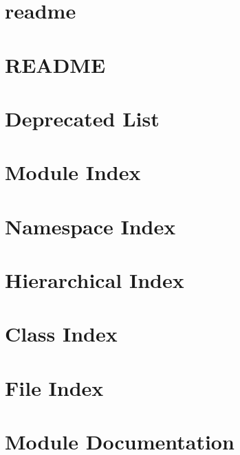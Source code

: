 \documentclass[twoside]{book}
\newcommand{\+}{\discretionary{\mbox{\scriptsize$\hookleftarrow$}}{}{}}
\begin{document}
\chapter{readme}
\label{md_cmake_build_debug__deps_sfml_src_readme}

\chapter{README}
\label{md_README}

\chapter{Deprecated List}
\label{deprecated}

\chapter{Module Index}

\chapter{Namespace Index}

\chapter{Hierarchical Index}

\chapter{Class Index}

\chapter{File Index}

\chapter{Module Documentation}






















\end{document}
